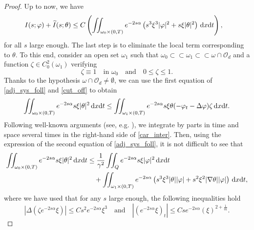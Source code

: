 \documentclass{dcds-bOF}
\theoremstyle{definition}
\def\dx{\,\textnormal{d}x}
\def\dt{\textnormal{d}t}
\begin{document}
\begin{proof}
Up to now, we have
%
\begin{equation}\label{est_locales}
\begin{split}
I(s;\varphi)+\widetilde{I}(s;\theta)\leq C&\left(\iint_{\omega_0\times(0,T)}e^{-2s\alpha}\left(s^3\xi^3|\varphi|^2+s\xi|\theta|^2\right)\dx\dt \right),
\end{split}
\end{equation}
%
for all $s$ large enough. The last step is to eliminate the local term corresponding to $\theta$. To this end, consider an open set $\omega_1$ such that $\omega_0\subset\subset\omega_1\subset \subset \omega\cap \mathcal O_d$ and a function $\zeta\in C_0^2(\omega_1)$ verifying
%
\begin{equation}\label{cut_off}
\zeta\equiv 1\quad \text{in } \omega_0 \quad \text{and} \quad 0\leq \zeta\leq 1.
\end{equation}
%
Thanks to the hypothesis $\omega\cap\mathcal O_d\neq \emptyset$, we can use the first equation of \eqref{adj_sys_foll} and \eqref{cut_off} to obtain
%
\begin{equation}\label{car_inter}
\iint_{\omega_0\times(0,T)}e^{-2s\alpha}s\xi|\theta|^2\dx\dt\leq \iint_{\omega_1\times(0,T)}e^{-2s\alpha}s\xi \theta(-\varphi_t-\Delta \varphi)\zeta\dx\dt.
\end{equation}
%
Following well-known arguments (see, e.g. \cite{luz_manuel,deteresa2000}), we integrate by parts in time and space several times in the right-hand side of \eqref{car_inter}. Then, using the expression of the second equation of \eqref{adj_sys_foll}, it is not difficult to see that
%
\begin{equation}\label{inter_res}
\begin{split}
\iint_{\omega_0\times(0,T)}e^{-2s\alpha}s\xi|\theta|^2\dx\dt&\leq \frac{1}{\gamma^2}\iint_{Q}e^{-2s\alpha}s\xi |\varphi|^2\dx\dt\\
&\quad+\iint_{\omega_1\times(0,T)}e^{-2s\alpha}\left(s^3\xi^3|\theta| |\varphi|+s^2\xi^2|\nabla \theta||\varphi|\right)\dx\dt,
\end{split}
\end{equation}
%
where we have used that for any $s$ large enough, the following inequalities hold
%
\begin{equation*}
|\Delta(\zeta e^{-2s\alpha}\xi)|\leq Cs^2e^{-2s\alpha}\xi^3 \quad \text{and}\quad |(e^{-2s\alpha}\xi)_t|\leq Cse^{-2s\alpha}(\xi)^{2+\frac{1}{m}}.
\end{equation*}
%


\end{proof}
\end{document}
